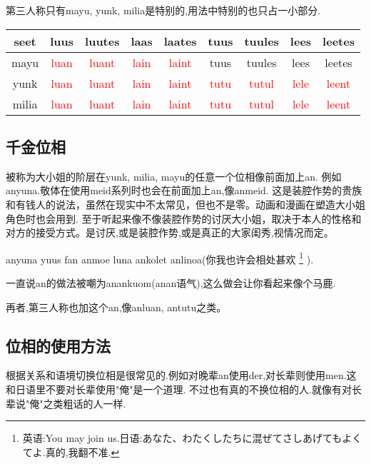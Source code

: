 第三人称只有mayu, yunk, milia是特别的,用法中特别的也只占一小部分.
\begin{table}[H]
		\begin{tabular}{|c|c|c|c|c|c|c|c|c|} %
		\hline
		seet&  luus&  luutes&  laas&  laates&  tuus&  tuules&  lees&  leetes\\\hline
		 mayu&  \textcolor{red}{luan}&  \textcolor{red}{luant}&  \textcolor{red}{lain}&  \textcolor{red}{laint}&  tuus&  tuules&  lees&  leetes\\\hline
		 yunk&  \textcolor{red}{luan}&  \textcolor{red}{luant}&  \textcolor{red}{lain}&  \textcolor{red}{laint}&  \textcolor{red}{tutu}&  \textcolor{red}{tutul}&  \textcolor{red}{lele}&  \textcolor{red}{leent}\\\hline
		 milia&   \textcolor{red}{luan}&  \textcolor{red}{luant}&  \textcolor{red}{lain}&  \textcolor{red}{laint}&  \textcolor{red}{tutu}&  \textcolor{red}{tutul}&  \textcolor{red}{lele}&  \textcolor{red}{leent}\\\hline

	\end{tabular}
\end{table}

\subsection{千金位相}

被称为大小姐的阶层在yunk, milia, mayu的任意一个位相像前面加上an.
例如anyuna.敬体在使用meid系列时也会在前面加上an,像anmeid.
这是装腔作势的贵族和有钱人的说法，虽然在现实中不太常见，但也不是零。动画和漫画在塑造大小姐角色时也会用到.
至于听起来像不像装腔作势的讨厌大小姐，取决于本人的性格和对方的接受方式。是讨厌,或是装腔作势,或是真正的大家闺秀,视情况而定。

anyuna yuus fan anmoe luna ankolet anlinoa(你我也许会相处甚欢
\footnote{英语:You may join us.日语:あなた、わたくしたちに混ぜてさしあげてもよくてよ.真的,我翻不准.
}
).

一直说an的做法被嘲为anankuom(anan语气),这么做会让你看起来像个马鹿.

再者,第三人称也加这个an,像anluan, antutu之类。

\subsection{位相的使用方法}


根据关系和语境切换位相是很常见的.例如对晚辈an使用der,对长辈则使用men.这和日语里不要对长辈使用"俺"是一个道理.
不过也有真的不换位相的人.就像有对长辈说"俺"之类粗话的人一样.

